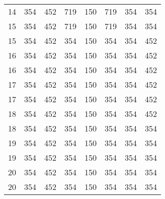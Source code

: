 \begin{longtable}{c|cccc|ccc}
14 & 354  & 452    & 719   & 150   & 719 & 354 & 354 \\
15 & 354  & 452    & 719   & 150   & 719 & 354 & 354 \\
15 & 354  & 452    & 354   & 150   & 354 & 354 & 452 \\
16 & 354  & 452    & 354   & 150   & 354 & 354 & 452 \\
16 & 354  & 452    & 354   & 150   & 354 & 354 & 452 \\
17 & 354  & 452    & 354   & 150   & 354 & 354 & 452 \\
17 & 354  & 452    & 354   & 150   & 354 & 354 & 452 \\
18 & 354  & 452    & 354   & 150   & 354 & 354 & 452 \\
18 & 354  & 452    & 354   & 150   & 354 & 354 & 354 \\
19 & 354  & 452    & 354   & 150   & 354 & 354 & 354 \\
19 & 354  & 452    & 354   & 150   & 354 & 354 & 354 \\
20 & 354  & 452    & 354   & 150   & 354 & 354 & 354 \\
20 & 354  & 452    & 354   & 150   & 354 & 354 & 354

\end{longtable}
